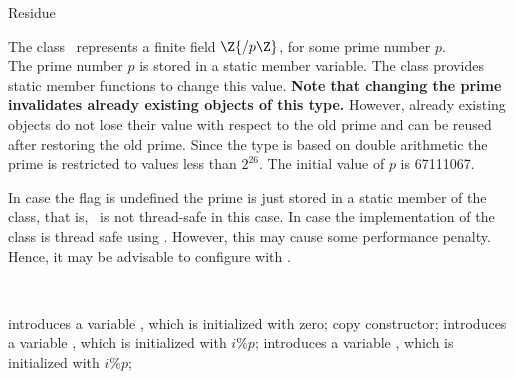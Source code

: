 \begin{ccRefClass} {Residue}
\label{Residue}

\def\ccTagOperatorLayout{\ccFalse}

\ccDefinition

The class \ccRefName\ represents a finite field $\Z{/p\Z}$, 
for some prime number $p$. \\

The prime number $p$ is stored in a static member variable. 
The class provides static member functions to change this value. 
{\bf Note that changing the prime invalidates already existing objects 
of this type.}
However, already existing objects do not lose their value with respect to the 
old prime and can be reused after restoring the old prime. 
Since the type is based on double 
arithmetic the prime is restricted to values less than $2^{26}$. 
The initial value of $p$ is 67111067. 

In case the flag  
is undefined the prime is just stored in a static member 
of the class, that is, \ccRefName\ is not thread-safe in this case.  
In case 
the implementation of the class is thread safe using 
. However, this may cause some performance 
penalty. Hence, it may be advisable to configure  with 
. 


\ccIsModel
{}\\


\ccCreation
{}

{introduces a variable \ccVar, which is initialized with zero;}
\ccGlue
{}
{copy constructor;}
\ccGlue
{}
{introduces a variable \ccVar, which is initialized with $i \%  p$;}
\ccGlue
{}
{introduces a variable \ccVar, which is initialized with $i \%  p$;}

\ccOperations

\ccGlue
{}
\ccGlue
{}



\end{ccRefClass}
